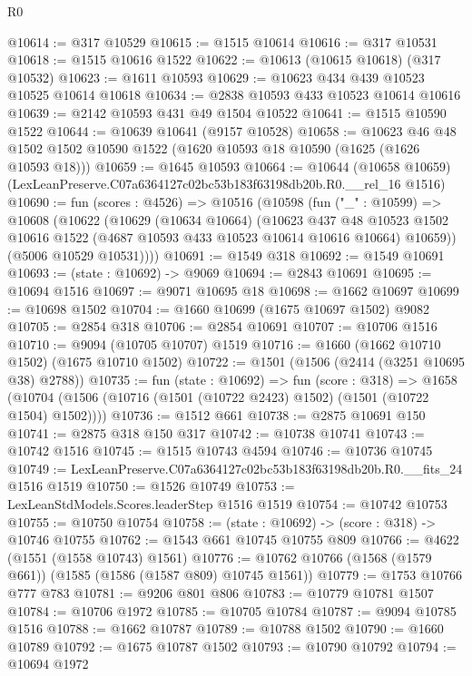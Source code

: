 \begin{lexlean}{R0}
\begin{coremodule}
@10614 := @317 @10529
@10615 := @1515 @10614
@10616 := @317 @10531
@10618 := @1515 @10616 @1522
@10622 := @10613 (@10615 @10618) (@317 @10532)
@10623 := @1611 @10593
@10629 := @10623 @434 @439 @10523 @10525 @10614 @10618
@10634 := @2838 @10593 @433 @10523 @10614 @10616
@10639 := @2142 @10593 @431 @49 @1504 @10522
@10641 := @1515 @10590 @1522
@10644 := @10639 @10641 (@9157 @10528)
@10658 := @10623
    @46
    @48
    @1502
    @1502
    @10590
    @1522
    (@1620 @10593 @18 @10590 (@1625 (@1626 @10593 @18)))
@10659 := @1645 @10593
@10664 := @10644
    (@10658 @10659)
    (LexLeanPreserve.C07a6364127c02bc53b183f63198db20b.R0.__rel_16 @1516)
@10690 := fun (scores : @4526) =>
  @10516
    (@10598
      (fun ("_" : @10599) =>
      @10608
        (@10622
          (@10629
            (@10634 @10664)
            (@10623
              @437
              @48
              @10523
              @1502
              @10616
              @1522
              (@4687 @10593 @433 @10523 @10614 @10616 @10664)
              @10659))
          (@5006 @10529 @10531))))
@10691 := @1549 @318
@10692 := @1549 @10691
@10693 := (state : @10692) -> @9069
@10694 := @2843 @10691
@10695 := @10694 @1516
@10697 := @9071 @10695 @18
@10698 := @1662 @10697
@10699 := @10698 @1502
@10704 := @1660 @10699 (@1675 @10697 @1502) @9082
@10705 := @2854 @318
@10706 := @2854 @10691
@10707 := @10706 @1516
@10710 := @9094 (@10705 @10707) @1519
@10716 := @1660 (@1662 @10710 @1502) (@1675 @10710 @1502)
@10722 := @1501 (@1506 (@2414 (@3251 @10695 @38) @2788))
@10735 := fun (state : @10692) =>
  fun (score : @318) =>
  @1658 (@10704 (@1506 (@10716 (@1501 (@10722 @2423) @1502) (@1501 (@10722 @1504) @1502))))
@10736 := @1512 @661
@10738 := @2875 @10691 @150
@10741 := @2875 @318 @150 @317
@10742 := @10738 @10741
@10743 := @10742 @1516
@10745 := @1515 @10743 @4594
@10746 := @10736 @10745
@10749 := LexLeanPreserve.C07a6364127c02bc53b183f63198db20b.R0.__fits_24 @1516 @1519
@10750 := @1526 @10749
@10753 := LexLeanStdModels.Scores.leaderStep @1516 @1519
@10754 := @10742 @10753
@10755 := @10750 @10754
@10758 := (state : @10692) -> (score : @318) -> @10746 @10755
@10762 := @1543 @661 @10745 @10755 @809
@10766 := @4622 (@1551 (@1558 @10743) @1561)
@10776 := @10762 @10766 (@1568 (@1579 @661)) (@1585 (@1586 (@1587 @809) @10745 @1561))
@10779 := @1753 @10766 @777 @783
@10781 := @9206 @801 @806
@10783 := @10779 @10781 @1507
@10784 := @10706 @1972
@10785 := @10705 @10784
@10787 := @9094 @10785 @1516
@10788 := @1662 @10787
@10789 := @10788 @1502
@10790 := @1660 @10789
@10792 := @1675 @10787 @1502
@10793 := @10790 @10792
@10794 := @10694 @1972

\end{coremodule}
\end{lexlean}
